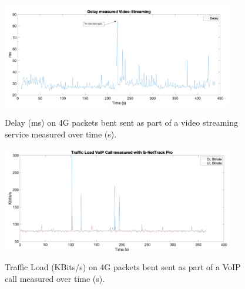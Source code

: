 \begin{itemize}
    \begin{figure}[!h]
        \includegraphics[width=0.9\textwidth]{images/chapter_3_design/delay_plotted_against_time_from_study}
        \centering~\caption{Delay (ms) on 4G packets bent sent as part of a video streaming service measured over
        time (s)\cite{study_on_quality_of_service_in_4G_and_5G_networks}.
        }\label{fig:chapter_3_design-delay_plotted_against_time_from_study}
    \end{figure}
    \begin{figure}[!h]
        \includegraphics[width=0.9\textwidth]{images/chapter_3_design/traffic_load_plotted_against_time_from_study}
        \centering~\caption{Traffic Load (KBits/s) on 4G packets bent sent as part of a VoIP call measured over
        time (s)\cite{study_on_quality_of_service_in_4G_and_5G_networks}.
        }\label{fig:chapter_3_design-traffic_load_plotted_against_time_from_study}
    \end{figure}


\end{itemize}
